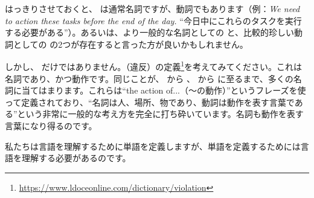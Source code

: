 はっきりさせておくと、 は通常名詞ですが、動詞でもあります（例：\textit{We need to \emph{action} these tasks before the end of the day.} \enquote{今日中にこれらのタスクを実行する必要がある}）。あるいは、より一般的な名詞としての  と、比較的珍しい動詞としての  の2つが存在すると言った方が良いかもしれません。

しかし、 だけではありません。（違反）の定義\footnote{\url{https://www.ldoceonline.com/dictionary/violation}}を考えてみてください。これは名詞であり、かつ動作です。同じことが、 から 、 から  に至るまで、多くの名詞に当てはまります。これらは\enquote{the action of...（～の動作）}というフレーズを使って定義されており、\enquote{名詞は人、場所、物であり、動詞は動作を表す言葉である}という非常に一般的な考え方を完全に打ち砕いています。名詞も動作を表す言葉になり得るのです。

私たちは言語を理解するために単語を定義しますが、単語を定義するためには言語を理解する必要があるのです。

